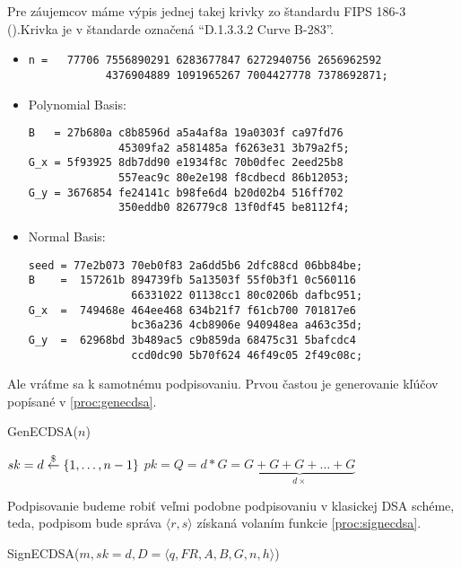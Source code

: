 \begin{poznamka}
    Pre záujemcov máme výpis jednej takej krivky zo štandardu FIPS 186-3
    (\cite{fips186}).Krivka je v štandarde označená
    ``D.1.3.3.2 Curve B-283''.
    \begin{itemize}
        \item
            \begin{verbatim}
n =   77706 7556890291 6283677847 6272940756 2656962592 
            4376904889 1091965267 7004427778 7378692871;
            \end{verbatim}
        \item Polynomial Basis:  
            \begin{verbatim}
B   = 27b680a c8b8596d a5a4af8a 19a0303f ca97fd76
              45309fa2 a581485a f6263e31 3b79a2f5;
G_x = 5f93925 8db7dd90 e1934f8c 70b0dfec 2eed25b8
              557eac9c 80e2e198 f8cdbecd 86b12053; 
G_y = 3676854 fe24141c b98fe6d4 b20d02b4 516ff702
              350eddb0 826779c8 13f0df45 be8112f4; 
            \end{verbatim}
        \item Normal Basis:  
            \begin{verbatim}
seed = 77e2b073 70eb0f83 2a6dd5b6 2dfc88cd 06bb84be;
B    =  157261b 894739fb 5a13503f 55f0b3f1 0c560116
                66331022 01138cc1 80c0206b dafbc951;
G_x  =  749468e 464ee468 634b21f7 f61cb700 701817e6
                bc36a236 4cb8906e 940948ea a463c35d; 
G_y  =  62968bd 3b489ac5 c9b859da 68475c31 5bafcdc4
                ccd0dc90 5b70f624 46f49c05 2f49c08c; 
            \end{verbatim}
    \end{itemize}
\end{poznamka}

Ale vráťme sa k samotnému podpisovaniu. Prvou častou je generovanie
kľúčov popísané v \ref{proc:genecdsa}.

\begin{procedure}[H]
    \caption{GenECDSA($n$)}
    \label{proc:genecdsa}
    $sk = d \overset{\$}{\leftarrow} \{1, \dots, n-1\}$ \;
    $pk = Q = d*G = \underbrace{G+G+G+\dots+G}_{d \times}$ \;
\end{procedure}

Podpisovanie budeme robiť veľmi podobne podpisovaniu v klasickej DSA
schéme, teda, podpisom bude správa $\langle r,s \rangle$ získaná 
volaním funkcie \ref{proc:signecdsa}.

\begin{procedure}[H]
    \caption{SignECDSA($m,sk=d, D=\langle q,FR, A,B,G,n,h \rangle$)}
    \label{proc:signecdsa}
    \;
\end{procedure}

